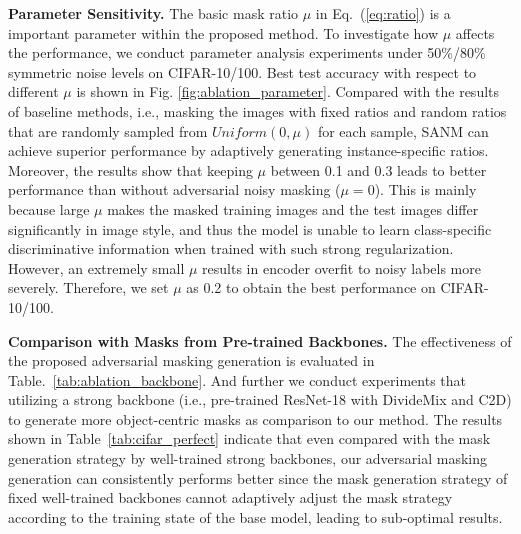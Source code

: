 \documentclass[10pt,twocolumn,letterpaper]{article}
\begin{document}
\textbf{Parameter Sensitivity.} {The basic mask ratio $\mu$ in Eq.~(\ref{eq:ratio}) is a important parameter within the proposed method. To investigate how $\mu$ affects the performance,} we conduct parameter analysis experiments under 50\%/80\% symmetric noise levels on CIFAR-10/100. Best test accuracy with respect to different $\mu$ is shown in Fig. \ref{fig:ablation_parameter}. Compared with the results of {baseline methods, i.e.,} masking the images with fixed ratios and random ratios that are randomly sampled from $Uniform(0,\mu)$ for each sample, SANM can achieve superior performance by adaptively generating instance-specific ratios. Moreover, the results show that keeping $\mu$ between 0.1 and 0.3 leads to better performance than without adversarial noisy masking ($\mu=0$). This is mainly because large $\mu$ makes the masked training images and the test images differ significantly in image style, and thus the model is unable to learn class-specific discriminative information when trained with such strong regularization. However, an extremely small $\mu$ {results in}
encoder overfit to noisy labels more severely. {Therefore}, we set $\mu$ as 0.2 to obtain the best performance on CIFAR-10/100. 

\textbf{Comparison with Masks from Pre-trained Backbones.} The effectiveness of the proposed adversarial masking generation is evaluated in Table.~\ref{tab:ablation_backbone}. And further we conduct experiments that utilizing a strong backbone (i.e., pre-trained ResNet-18 with DivideMix and C2D) to generate more object-centric masks as comparison to our method. The results shown in Table~\ref{tab:cifar_perfect} indicate that even compared with the mask generation strategy by well-trained strong backbones, our adversarial masking generation can consistently performs better since the mask generation strategy of fixed well-trained backbones cannot adaptively adjust the mask strategy according to the training state of the base model, leading to sub-optimal results.


\iffalse
\textbf{Quantitative Results.} To further verify the regularization effect of SANM on the activation map, we visualize the activation maps of DivideMix and SANM (DivideMix) for both correctly and incorrectly labeled samples. As shown in Fig.~\ref{fig:ablation_activation}, for DivideMix, due to the influence of noisy samples, the activation maps of correctly labeled samples are focused on specific areas of the target instead of covering the whole object, while the results of mislabeled ones pay more attention to the meaningless background area, resulting in poor representation quality. By contrast, the results of SANM (DivideMix) cover the central regions of the objects for both samples and more information can be {covered} in our features, {even for the samples that are not object-centric (see Fig.~\ref{fig:ablation_noncenter}),} 
{indicating} that SANM can alleviate confirmation bias and prevent models from over-fitting to noisy labels by imposing explicit regularization on the peak locations. 
\fi
\end{document}

